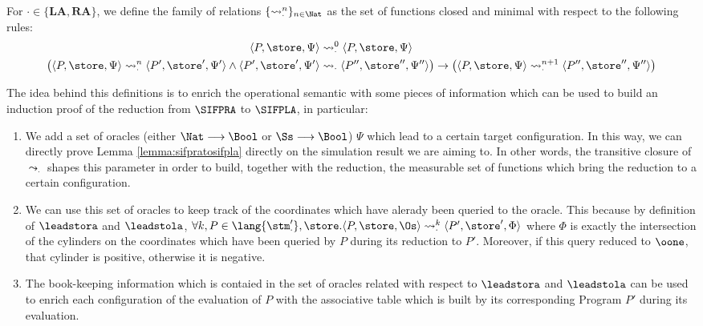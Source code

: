 \begin{defn}
  For $\cdot \in \{\mathbf{LA}, \mathbf{RA}\}$,
  we define the family of relations  $\{\leadsto_\cdot^n\}_{n\in \Nat}$
  as the set of functions closed and minimal with respect to the following rules:
  $$
  \begin{aligned}
    \langle P, \store, \Psi\rangle &\leadsto_\cdot^0\langle P, \store, \Psi\rangle\\
    \big( \langle P, \store, \Psi\rangle \leadsto_\cdot^n\langle P', \store', \Psi'\rangle \land \langle P', \store', \Psi'\rangle &\leadsto_\cdot\langle P'', \store'', \Psi''\rangle\big) \to\big(
    \langle P, \store, \Psi\rangle \leadsto_\cdot^{n+1}\langle P'', \store'', \Psi''\rangle\big)
  \end{aligned}
  $$
\end{defn}

The idea behind this definitions is to enrich the operational semantic with some
pieces of information which can be used to build an induction
proof of the reduction from $\SIFPRA$ to $\SIFPLA$, in particular:

\begin{enumerate}
  \item We add a set of oracles
  (either $\Nat \longrightarrow \Bool$ or $\Ss \longrightarrow \Bool$) $\Psi$
  which  lead to a certain
  target configuration.
  In this way, we can directly prove Lemma \ref{lemma:sifpratosifpla}
  directly on the simulation result we are aiming to. In other words,
  the transitive closure of $\leadsto_\cdot$ shapes this parameter in order
  to build, together with the reduction, the measurable set of functions which
  bring the reduction to a certain configuration.
  \item We can use this set of oracles to keep track of the coordinates
  which have alerady been queried to the oracle. This because by definition of
  $\leadstora$ and $\leadstola$, $\forall k, P \in \lang{\stm_\cdot'}, \store.
  \langle P, \store, \Os\rangle \leadsto_\cdot^k \langle P', \store', \Phi\rangle$
  where $\Phi$ is exactly the intersection of the cylinders on the coordinates
  which have been queried by $P$ during its reduction to $P'$. Moreover, if
  this query reduced to $\oone$, that cylinder is positive, otherwise it is negative.
  \item The book-keeping information which is contaied in the set of oracles related
  with respect to $\leadstora$ and $\leadstola$ can be used to enrich each
  configuration of the evaluation of $P$ with the associative table
  which is built by its corresponding Program $P'$ during its evaluation.
\end{enumerate}

